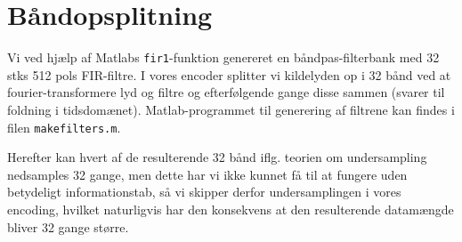 \section{Båndopsplitning}
\label{sec.subband}
Vi ved hjælp af Matlabs \texttt{fir1}-funktion genereret en båndpas-filterbank med 32 stks 512 pols FIR-filtre. I vores encoder splitter vi kildelyden op i 32 bånd ved at fourier-transformere lyd og filtre og efterfølgende gange disse sammen (svarer til foldning i tidsdomænet). Matlab-programmet til generering af filtrene kan findes i filen \texttt{make\-filters.m}.

Herefter kan hvert af de resulterende 32 bånd iflg. teorien om undersampling nedsamples 32 gange, men dette har vi ikke kunnet få til at fungere uden betydeligt informationstab, så vi skipper derfor undersamplingen i vores encoding, hvilket naturligvis har den konsekvens at den resulterende datamængde bliver 32 gange større.
